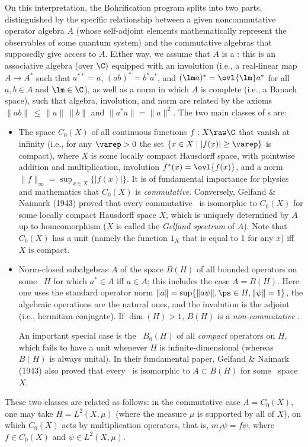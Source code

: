 \documentclass[12pt]{article}
\begin{document}
 On this interpretation, the Bohrification program splits into two parts, distinguished by the specific relationship between a given 
 noncommutative operator algebra $A$ (whose self-adjoint elements mathematically represent the observables of some quantum system) and the commutative algebras that supposedly give access to $A$. Either way, we assume that $A$ is a \ca: this is an associative algebra (over $\C)$ equipped with an involution (i.e.,  a real-linear map
$A\rightarrow A^*$ such that  $a^{**} =  a$, $(ab)^*  = b^* a^*$, and $(\lm a)^*  =
\ovl{\lm}a^*$ for all $a,b\in{A}$ and $\lm\in\C$), as well as a norm in which $A$ is complete (i.e., a Banach space),  such that algebra, involution, and norm are related by the axioms $\|ab\|\,\leq\, \| a\|\,\| b\|$ and $\|a^*a\|  =  \| a\|^2$. The two main classes of \ca s are:
\begin{itemize}
\item The space $C_0(X)$ of all  continuous functions $f:X\raw\C$  that vanish at
infinity (i.e., 
 for any  $\varep>0$ the set $\{x\in X\mid |f(x)|\geq \varep\}$ is compact),  where $X$ is some locally compact Hausdorff space, with pointwise  addition and
multiplication, involution  $f^*(x)=\ovl{f(x)}$,
and a  norm $\|f\|_{\infty}=\sup_{x\in X} \{|f(x)|\}$.
It is of fundamental importance for physics and mathematics that
 $C_0(X)$ is \emph{commutative}. Conversely,  Gelfand \& Naimark (1943) proved that every commutative \ca\ is isomorphic to $C_0(X)$ for some  locally compact Hausdorff  space $X$, which is uniquely determined by $A$ up to homeomorphism ($X$ is called the \emph{Gelfand spectrum} of $A$). 
 Note that $C_0(X)$ has a unit (namely the function $1_X$ that is equal to 1 for any $x$) iff $X$ is compact.
   \item 
   Norm-closed subalgebras $A$ of the space $B(H)$  of all bounded operators on some \Hs\ $H$
   for which $a^*\in A$ iff $a\in A$; this includes the case $A=B(H)$. Here one uses  the standard operator norm $\|a\|=\sup\{\|a\psi\|, \ps\in H, \|\psi\|=1\}$,  the algebraic operations are the natural ones, and the
 involution is the adjoint (i.e., hermitian conjugate). 
  If $\dim(H)>1$, $B(H)$ is a  \emph{non-commutative} \ca. 
  
  An important special case is the \ca\ 
 $B_0(H)$ of all \emph{compact} operators on  $H$, which fails to have a unit whenever $H$ is infinite-dimensional 
 (whereas $B(H)$ is always unital). In their fundamental paper, Gelfand \& Naimark (1943) also proved that every  \ca\ is isomorphic to $A\subset B(H)$ for some  \Hs\ space $X$.
\end{itemize}
These two classes are related as follows: in the commutative case $A= C_0(X)$, one may 
 take $H=L^2(X,\mu)$ (where the measure $\mu$ is supported by all 
 of $X$), on which $C_0(X)$ acts by multiplication operators, that is, $m_f\psi=f\psi$, where  $f\in C_0(X)$ and $\psi\in L^2(X,\mu)$.
\end{document}

